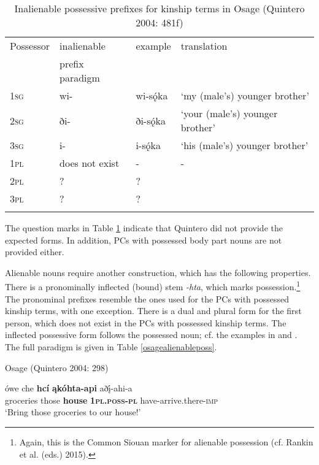 \documentclass[output=paper]{LSP/langsci}
\begin{document}
\begin{table}
\caption{Inalienable possessive prefixes for kinship terms in Osage (Quintero 2004: 481f)} \label{osageinalienable}
\begin{tabular}[h!]{ l l l l }
\lsptoprule
Possessor	 & inalienable & example & translation \\
& prefix paradigm & & \\
\midrule
\textsc{1sg} & wi-	& wi-sǫ́ka & `my (male's) younger brother' \\
 
\textsc{2sg} & ði- & ði-sǫ́ka & `your (male's) younger brother' \\
 
\textsc{3sg} & i- & i-sǫ́ka & `his (male's) younger brother' \\
 
\textsc{1pl} & does not exist &	- & - \\
 
\textsc{2pl} & ? & ? & \\
 
\textsc{3pl} & ? & ? & \\
\lspbottomrule
\end{tabular}
\end{table}
 
The question marks in Table \ref{osageinalienable} indicate that Quintero did not provide the expected forms. In addition, PCs with possessed body part nouns are not provided either.

Alienable nouns require another construction, which has the following properties. There is a pronominally inflected (bound) stem \textit{-hta}, which marks possession.\footnote{Again, this is the Common Siouan marker for alienable possession (cf. Rankin et al. (eds.) 2015).} The pronominal prefixes resemble the ones used for the PCs with possessed kinship terms, with one exception. There is a dual and plural form for the first person, which does not exist in the PCs with possessed kinship terms. The inflected possessive form follows the possessed noun; cf. the examples in  and . The full paradigm is given in Table \ref{osagealienableposs}.

\ea	Osage (Quintero 2004: 298) \label{osagegroceries}

\gll ówe  che    \textbf{hc\'i} \textbf{ \k{a}kóhta-api}  aðį́-ahi-a \\
groceries  those \textbf{house} \textbf{\textsc{1pl.poss-pl}}   have-arrive.there-\textsc{imp} \\
\glt `Bring those groceries to our house!'
\end{document}
